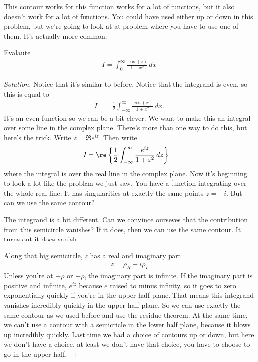 This contour works for this function works for a lot of functions,
but it also doesn't work for a lot of functions.
You could have used either up or down in this problem,
but we're going to look at at problem where you have to use one of them.
It's actually more common.

\begin{example}
    Evalaute
    \begin{align}
        I = \int_{0}^{\infty} \frac{\cos(z)}{1 + x^2}\,dx
    \end{align}
\end{example}
\begin{proof}[Solution]
    Notice that it's similar to before.
    Notice that the integrand is even, so this is equal to
    \begin{align}
        I &=
        \frac{1}{2}\int_{-\infty}^{\infty}
        \frac{\cos(x)}{1 + x^2}\,dx.
    \end{align}
    It's an even function so we can be a bit clever.
    We want to make this an integral over some line in the complex plane.
    There's more than one way to do this,
    but here's the trick.
    Write $z = \Re e^{iz}$.
    Then write
    \begin{align}
        I &= \re\left\{
        \frac{1}{2}
        \int_{-\infty}^{\infty}
        \frac{e^{iz}}{1 + z^2}\,
        dz
        \right\}
    \end{align}
    where the integral is over the real line in the complex plane.
    Now it's beginning to look a lot like the problem we just saw.
    You have a function integrating over the whole real line.
    It has singularities at exactly the same points $z=\pm i$.
    But can we use the same contour?

    The integrand is a bit different.
    Can we convince ourseves that the contribution from this semicircle
    vanishes?
    If it does, then we can use the same contour.
    It turns out it does vanish.

    Along that big semicircle, $z$ has a real and imaginary part
    \begin{align}
        z = \rho_R + i\rho_I
    \end{align}
    Unless you're at $+\rho$ or $-\rho$,
    the imaginary part is infinite.
    If the imaginary part is positive and infinite,
    $e^{iz}$ because $e$ raised to minus infinity,
    so it goes to zero exponentially quickly
    if you're in the upper half plane.
    That means this integrand vanishes incredibly quickly in the upper half
    plane.
    So we can use exactly the same contour as we used before
    and use the residue theorem.
    At the same time,
    we can't use a contour with a semicricle in the lower half plane,
    because it blows up incredibly quickly.
    Last time we had a choice of contours up or down,
    but here we don't have a choice,
    at least we don't have that choice,
    you have to choose to go in the upper half.
\end{proof}
